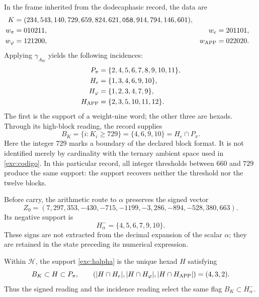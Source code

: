 In the frame inherited from the dodecaphasic record, the data are
\begin{align}
 K={}&(234,543,140,729,659,824,621,\mathtt{058},914,794,146,601),
 \label{exc:k}\\
 w_\pi={}&010211, &w_e={}&201101,\nonumber\\
 w_\varphi={}&121200, &w_{\rm APP}={}&022020.\nonumber
\end{align}
Applying $\gamma_{A_W}$ yields the following incidences:
\begin{align*}
 P_\pi&=\{2,4,5,6,7,8,9,10,11\},\\
 H_e&=\{1,3,4,6,9,10\},\\
 H_\varphi&=\{1,2,3,4,7,9\},\\
 H_{\rm APP}&=\{2,3,5,10,11,12\}.
\end{align*}
The first is the support of a weight-nine word; the other three
are hexads. Through its high-block reading, the record supplies
\begin{equation}
 B_K=\{i:K_i\geq729\}=\{4,6,9,10\}=H_e\cap P_\pi.
 \label{exc:bk}
\end{equation}
Here the integer $729$ marks a boundary of the declared
block format. It is not identified merely by cardinality with the
ternary ambient space used in \eqref{exc:codigo}. In this particular record, all
integer thresholds between $660$ and $729$ produce the same support:
the support recovers neither the threshold nor the twelve blocks.

Before carry, the arithmetic route to $\alpha$ preserves the
signed vector
\begin{equation}
 Z_0=(7,297,353,-430,-715,-1199,-3,286,-894,-528,380,663).
 \label{exc:precarry}
\end{equation}
Its negative support is
\begin{equation}
 H^-_\alpha=\{4,5,6,7,9,10\}.
 \label{exc:halpha}
\end{equation}
These signs are not extracted from the decimal expansion of the scalar
$\alpha$; they are retained in the state preceding its numerical expression.



\begin{proposition}
\label{exc:selector-bandera}
Within $\mathcal H$, the support \eqref{exc:halpha} is the unique hexad
$H$ satisfying
\[
 B_K\subset H\subset P_\pi,
 \qquad
 (|H\cap H_e|,|H\cap H_\varphi|,|H\cap H_{\rm APP}|)=(4,3,2).
\]
Thus the signed reading and the incidence reading select the same
flag $B_K\subset H^-_\alpha$.
\end{proposition}


